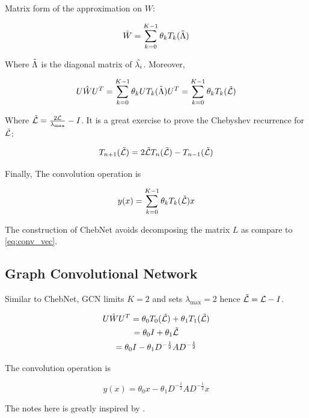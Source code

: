 \documentclass{article}
\begin{document}
    Matrix form of the approximation on $W$:

    \begin{equation}
        \hat{W} = \sum_{k=0}^{K-1} \theta_k T_k(\Tilde{\Lambda})
    \end{equation}

    Where $\Tilde{\Lambda}$ is the diagonal matrix of $\Tilde{\lambda_i}$. Moreover,

    \begin{equation}
        U \hat{W} U^T = \sum_{k=0}^{K-1} \theta_k U T_k(\Tilde{\Lambda}) U^T = \sum_{k=0}^{K-1} \theta_k T_k(\Tilde{\mathcal{L}})
    \end{equation}

    Where $\Tilde{\mathcal{L}} = \frac{2 \mathcal{L}}{\lambda_{\max}} - I$. It is a great exercise to prove the Chebyshev recurrence for $\Tilde{\mathcal{L}}$:

    \begin{equation}
        T_{n+1}(\Tilde{\mathcal{L}}) = 2 \Tilde{\mathcal{L}} T_n(\Tilde{\mathcal{L}}) - T_{n-1}(\Tilde{\mathcal{L}})
    \end{equation}



    Finally, The convolution operation is

    \begin{equation}
        y(x) = \sum_{k=0}^{K-1} \theta_k T_k(\Tilde{\mathcal{L}}) x
    \end{equation}

    The construction of ChebNet avoids decomposing the matrix $L$ as compare to \ref{eq:conv_vec}.

    \subsection{Graph Convolutional Network}

    Similar to ChebNet, GCN \cite{kipf2016semi} limits $K = 2$ and sets $\lambda_{\max} = 2$ hence $\Tilde{\mathcal{L}} = \mathcal{L} - I$.

    \begin{gather*}
        U \hat{W} U^T = \theta_0 T_0(\Tilde{\mathcal{L}}) + \theta_1 T_1(\Tilde{\mathcal{L}}) \\
        = \theta_0 I + \theta_1 \Tilde{\mathcal{L}} \\
        = \theta_0 I - \theta_1 D^{-\frac{1}{2}} A D^{-\frac{1}{2}}
    \end{gather*}

    The convolution operation is

    \begin{equation}
        y(x) = \theta_0 x - \theta_1 D^{-\frac{1}{2}} A D^{-\frac{1}{2}} x
    \end{equation}

    The notes here is greatly inspired by \cite{chen2020note}.

    
    
\end{document}
